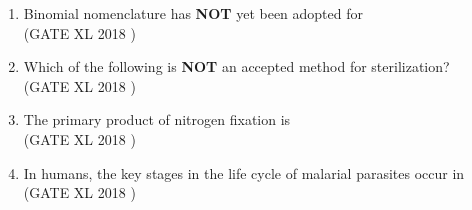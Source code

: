 \documentclass[14pt]{extarticle}
\begin{document}
\begin{flushleft}
\begin{enumerate}
\item Binomial nomenclature has \textbf{NOT} yet been adopted for\\
\hfill(GATE XL 2018 )\\
\begin{enumerate}[label=(\Alph*)]
\end{enumerate}

\item Which of the following is \textbf{NOT} an accepted method for sterilization?\\
\hfill(GATE XL 2018 )\\
\begin{enumerate}[label=(\Alph*)]
\end{enumerate}

\item The primary product of nitrogen fixation is\\
\hfill(GATE XL 2018 )\\
\begin{enumerate}[label=(\Alph*)]
\end{enumerate}

\item In humans, the key stages in the life cycle of malarial parasites occur in\\
\hfill(GATE XL 2018 )\\
\begin{enumerate}[label=(\Alph*)]
\end{enumerate}


\end{enumerate}
\end{flushleft}
\end{document}
